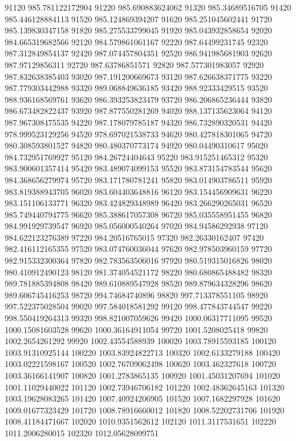 {91120 985.781122172904
91220 985.690883624062
91320 985.34689516705
91420 985.446128884113
91520 985.124869394207
91620 985.251045602441
91720 985.139830347158
91820 985.275533799045
91920 985.043932858654
92020 984.665319682566
92120 984.579861061167
92220 987.64499231745
92320 987.312849854137
92420 987.074457804351
92520 986.941985681903
92620 987.97129856311
92720 987.63786851571
92820 987.577301983057
92920 987.832638385403
93020 987.191200669673
93120 987.626638371775
93220 987.779303442988
93320 989.068849636185
93420 988.92333429515
93520 988.936168569761
93620 986.393253823479
93720 986.206865236444
93820 986.673482822437
93920 987.877550281269
94020 988.137135623064
94120 987.967308475535
94220 987.178079785187
94320 986.732890320531
94420 978.999523129256
94520 978.697021538733
94620 980.427818301065
94720 980.308593801527
94820 980.480370773174
94920 980.04490310617
95020 984.732951769927
95120 984.26724404643
95220 983.915251465312
95320 983.900601357414
95420 983.489074099153
95520 983.873154783544
95620 984.368656279974
95720 983.171780781241
95820 983.014903786511
95920 983.819388943705
96020 983.604403648816
96120 983.154456909631
96220 983.151106133771
96320 983.424829348989
96420 983.266290265031
96520 985.749440794775
96620 985.388617057308
96720 985.035558951455
96820 984.991929739547
96920 985.056000540264
97020 984.94586292938
97120 984.622123276389
97220 984.20516765015
97320 982.26330162407
97420 982.416112165355
97520 983.074760036044
97620 982.978503960159
97720 982.915332300364
97820 982.783563506016
97920 980.519315016826
98020 980.410912490123
98120 981.374054521172
98220 980.680865488482
98320 989.781885394808
98420 989.610889547928
98520 989.879634328296
98620 989.606745416253
98720 994.74684740896
98820 997.713378551105
98920 997.522375028504
99020 997.584018581292
99120 998.477843744547
99220 998.550419264313
99320 998.821007059626
99420 1000.06317711095
99520 1000.15081603528
99620 1000.36164911054
99720 1001.5208025418
99820 1002.2654261292
99920 1002.43554588939
100020 1003.78915593185
100120 1003.91310925144
100220 1003.83924822713
100320 1002.6133279188
100420 1003.02221598167
100520 1002.76709062498
100620 1003.462327618
100720 1003.36166141907
100820 1001.2783865135
100920 1001.45031207694
101020 1001.11029440022
101120 1002.73946706182
101220 1002.48362645163
101320 1003.19628083265
101420 1007.40924206905
101520 1007.1682297928
101620 1009.01677323429
101720 1008.78916660012
101820 1008.52202731706
101920 1008.41184471667
102020 1010.9351562612
102120 1011.3117531651
102220 1011.2006280015
102320 1012.05628099751
}
